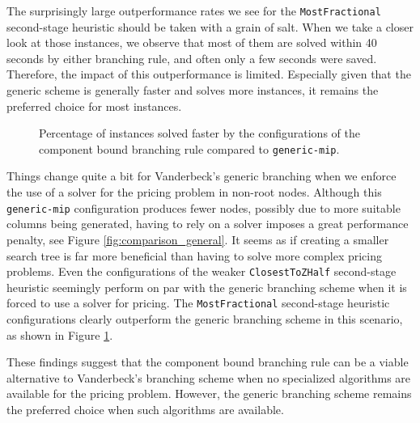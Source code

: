 The surprisingly large outperformance rates we see for the \texttt{MostFractional} second-stage heuristic should be taken with a grain of salt. When we take a closer look at those instances, we observe that most of them are solved within 40 seconds by either branching rule, and often only a few seconds were saved. Therefore, the impact of this outperformance is limited. Especially given that the generic scheme is generally faster and solves more instances, it remains the preferred choice for most instances.

\begin{figure}
	\centering

	\begin{subfigure}{0.495\textwidth}
		\centering
		
	\end{subfigure}
	\hfill
	\begin{subfigure}{0.495\textwidth}
		\centering
		
	\end{subfigure}

	\caption{Percentage of instances solved faster by the configurations of the component bound branching rule compared to \texttt{generic-mip}.}
	\label{fig:comparison_outperform_generic_mip}
\end{figure}

Things change quite a bit for Vanderbeck's generic branching when we enforce the use of a \MIP{} solver for the pricing problem in non-root nodes. Although this \texttt{generic-mip} configuration produces fewer nodes, possibly due to more suitable columns being generated, having to rely on a \MIP{} solver imposes a great performance penalty, see Figure \ref{fig:comparison_general}. It seems as if creating a smaller search tree is far more beneficial than having to solve more complex pricing problems. Even the configurations of the weaker \texttt{ClosestToZHalf} second-stage heuristic seemingly perform on par with the generic branching scheme when it is forced to use a \MIP{} solver for pricing. The \texttt{MostFractional} second-stage heuristic configurations clearly outperform the generic branching scheme in this scenario, as shown in Figure \ref{fig:comparison_outperform_generic_mip}.

These findings suggest that the component bound branching rule can be a viable alternative to Vanderbeck's branching scheme when no specialized algorithms are available for the pricing problem. However, the generic branching scheme remains the preferred choice when such algorithms are available.

